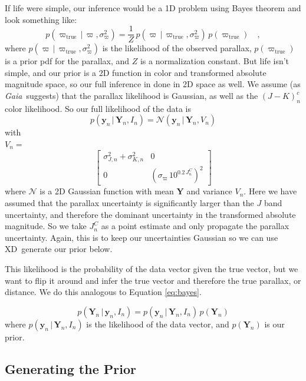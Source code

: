 \documentclass[modern]{aastex61}
\newcommand{\acronym}[1]{{\small{#1}}}
\newcommand{\project}[1]{\textsl{#1}}
\newcommand{\gaia}{\project{Gaia}}
\newcommand{\xd}{\acronym{XD}}
\newcommand{\given}{\,|\,}
\newcommand{\true}{\mathrm{true}}
\begin{document}
If life were simple, our inference would be a 1D problem using Bayes theorem and look something like:
\begin{equation}
p(\varpi_{\true} \given \varpi, \sigma^2_{\varpi}) = \frac{1}{Z}\,p(\varpi \given \varpi_{\true}, \sigma^2_{\varpi}) \, p(\varpi_{\true}) \quad ,
\label{eq:bayes}
\end{equation}
where $p(\varpi \given \varpi_{\true}, \sigma^2_{\varpi})$ is the likelihood of the observed parallax, $p(\varpi_{\true})$ is a prior pdf for the
parallax, and $Z$ is a normalization constant.
But life isn't simple, and our prior is a 2D function in color and transformed absolute magnitude space, so our full inference in done in 2D space as well.
We assume (as \gaia\ suggests) that the parallax likelihood is Gaussian, as well as the $(J-K)^c_n$ color likelihood. So our full likelihood of the data is
\begin{equation}
p(\mathbf{y}_n \given \mathbf{Y}_n, I_n) = \mathcal{N}(\mathbf{y}_n \given \mathbf{Y}_n, V_n)
\end{equation}
with \\
$V_n = $
\[
\begin{bmatrix}
\sigma_{J,n}^2 + \sigma_{K,n}^2 & 0 \\
0 & (\sigma_{\varpi}\,10^{0.2\,J_n^C})^2
\end{bmatrix}
\]
where $\mathcal{N}$ is a 2D Gaussian function with mean $\mathbf{Y}$ and variance $V_n$.
Here we have assumed that the parallax uncertainty is significantly larger than the $J$ band uncertainty, and therefore the dominant uncertainty in the transformed absolute magnitude. So we take $J_n^C$ as a point estimate and only propagate the parallax uncertainty. Again, this is to keep our uncertainties Gaussian so we can use \xd\ generate our prior below.

This likelihood is the probability of the data vector given the true vector, but we
want to flip it around and infer the true vector and therefore the true parallax, or distance. We do this
analogous to Equation \ref{eq:bayes}.


\begin{equation}
p(\mathbf{Y}_n \given \mathbf{y}_n, I_n) = p(\mathbf{y}_n \given \mathbf{Y}_n, I_n) \, p(\mathbf{Y}_n)
\end{equation}
where $p(\mathbf{y}_n \given \mathbf{Y}_n, I_n)$ is the likelihood of the data vector, and $p(\mathbf{Y}_n)$ is our prior.

\subsection{Generating the Prior}
\end{document}
